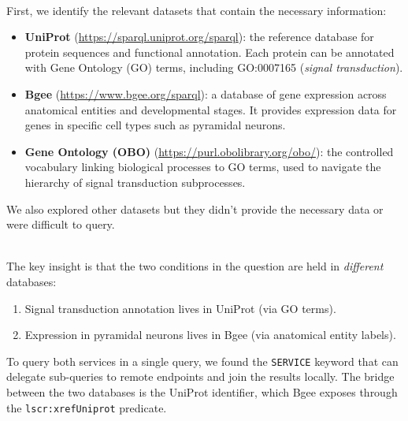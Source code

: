 \documentclass[12pt,a4paper]{article}
\begin{document}
~  
\text{ }\\
First, we identify the relevant datasets that contain the necessary information:
\begin{itemize}
  \item \textbf{UniProt} (\url{https://sparql.uniprot.org/sparql}): the
        reference database for protein sequences and functional annotation.
        Each protein can be annotated with Gene Ontology (GO) terms, including
        GO:0007165 (\emph{signal transduction}).
  \item \textbf{Bgee} (\url{https://www.bgee.org/sparql}): a database of gene
        expression across anatomical entities and developmental stages.
        It provides expression data for genes in specific cell types such as
        pyramidal neurons.
  \item \textbf{Gene Ontology (OBO)} (\url{https://purl.obolibrary.org/obo/}):
        the controlled vocabulary linking biological processes to GO terms,
        used to navigate the hierarchy of signal transduction subprocesses.
\end{itemize}
We also explored other datasets but they didn't provide the necessary data or were difficult to query.



\text{ }\\
The key insight is that the two conditions in the question are held in \emph{different} databases:
\begin{enumerate}
  \item Signal transduction annotation lives in UniProt (via GO terms).
  \item Expression in pyramidal neurons lives in Bgee (via anatomical entity
        labels).
\end{enumerate}
To query both services in a single query, we found the \texttt{SERVICE} keyword 
that can delegate sub-queries to remote endpoints and join the results locally. 
The bridge between the two databases is the UniProt identifier, which
Bgee exposes through the \texttt{lscr:xrefUniprot} predicate.
\end{document}
